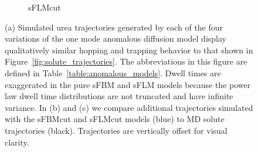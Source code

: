 \documentclass[journal=jctcce,manuscript=article]{achemso}
\begin{document}
\begin{figure}
\begin{subfigure}{0.325\textwidth}
  \caption{sFLMcut}\label{fig:ad_realizations_sFLMcut_stacked}
  \end{subfigure}
  \caption{(a) Simulated urea trajectories generated by each of the four
	  variations of the one mode anomalous diffusion model display qualitatively
	  similar hopping and trapping behavior to that shown in 
	  Figure~\ref{fig:solute_trajectories}. The abbreviations in this figure are
	  defined in Table~\ref{table:anomalous_models}. Dwell times are exaggerated
	  in the pure sFBM and sFLM models because the power law dwell time
	  distributions are not truncated and have infinite variance. In (b)
	  and (c) we compare additional trajectories simulated with the sFBMcut
	  and sFLMcut models (blue) to MD solute trajectories (black).
	  Trajectories are vertically offset for visual clarity.
  }\label{fig:ad_eyetest}
  \end{figure}
    
\end{document}
